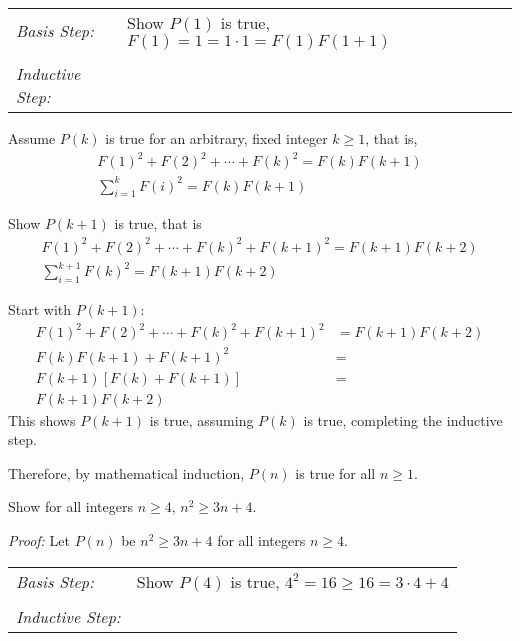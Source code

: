 \begin{questions}
\begin{solution}
  \smallskip
  \begin{tabular}{lp{4in}}
    \textit{Basis Step:} & Show $P(1)$ is true, $F(1) = 1 = 1\cdot1 = F(1)F(1+1)$ \\
     & \\
   \textit{Inductive Step:} &  \\
  \end{tabular}

  Assume $P(k)$ is true for an arbitrary, fixed integer $k \geq 1$, that is,
  \begin{align*}
    F(1)^2 + F(2)^2 + \cdots + F(k)^2  = F(k)F(k+1)  \tag{IH} \\
    \sum_{i=1}^k F(i)^2 = F(k)F(k+1)
  \end{align*}

  Show $P(k+1)$ is true, that is
  \begin{align*}
    F(1)^2 + F(2)^2 + \cdots + F(k)^2 + F(k+1)^2 = F(k+1)F(k+2) \\
    \sum_{i=1}^{k+1} F(k)^2 = F(k+1)F(k+2) 
  \end{align*}

  Start with $P(k+1)$:
  \begin{align*}
    F(1)^2 + F(2)^2 + \cdots + F(k)^2 + F(k+1)^2 &= F(k+1)F(k+2) \\
    F(k)F(k+1) + F(k+1)^2 &= \tag{IH} \\
    F(k+1)\left[ F(k) + F(k+1) \right] &= \\
    F(k+1)F(k+2) 
  \end{align*}
  This shows $P(k+1)$ is true, assuming $P(k)$ is true, completing the inductive step. 

  Therefore, by mathematical induction, $P(n)$ is true for all $n \geq 1$.
\end{solution}



 Show for all integers $n \geq 4$, $n^2 \geq 3n + 4$. 
    \ifprintanswers
        \vspace{-10pt}
   \fi
\begin{solution}
  \textit{Proof:}
  Let $P(n)$ be $n^2 \geq 3n + 4$ for all integers $n \geq 4$.

  \smallskip
  \begin{tabular}{lp{4in}}
    \textit{Basis Step:} & Show $P(4)$ is true, $4^2 = 16 \geq 16 = 3\cdot 4 + 4$ \\
     & \\
   \textit{Inductive Step:} &  \\
  \end{tabular}


\end{solution}
\end{questions}
